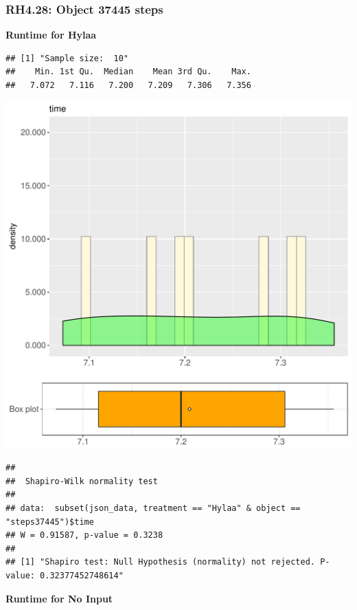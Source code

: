 \documentclass{article}\usepackage[]{graphicx}\usepackage[]{color}
\makeatletter
\def\maxwidth{ %
  \ifdim\Gin@nat@width>\linewidth
    \linewidth
  \else
    \Gin@nat@width
  \fi
}
\newenvironment{kframe}{%
 \def\at@end@of@kframe{}%
 \ifinner\ifhmode%
  \def\at@end@of@kframe{\end{minipage}}%
  \begin{minipage}{\columnwidth}%
 \fi\fi%
 \def\FrameCommand##1{\hskip\@totalleftmargin \hskip-\fboxsep
 \colorbox{shadecolor}{##1}\hskip-\fboxsep
     \hskip-\linewidth \hskip-\@totalleftmargin \hskip\columnwidth}%
 \MakeFramed {\advance\hsize-\width
   \@totalleftmargin\z@ \linewidth\hsize
   \@setminipage}}%
 {\par\unskip\endMakeFramed%
 \at@end@of@kframe}
\newenvironment{knitrout}{}{} %
\makeatother
\begin{document}
\subsubsection{RH4.28: Object 37445 steps}

 \textbf{Runtime for Hylaa}
\begin{knitrout}
\color{fgcolor}\begin{kframe}
\begin{verbatim}
## [1] "Sample size:  10"
##    Min. 1st Qu.  Median    Mean 3rd Qu.    Max. 
##   7.072   7.116   7.200   7.209   7.306   7.356
\end{verbatim}
\end{kframe}
\includegraphics[width=\maxwidth]{figure/RH4_Hylaa_steps37445-1} 
\begin{kframe}\begin{verbatim}
## 
## 	Shapiro-Wilk normality test
## 
## data:  subset(json_data, treatment == "Hylaa" & object == "steps37445")$time
## W = 0.91587, p-value = 0.3238
## 
## [1] "Shapiro test: Null Hypothesis (normality) not rejected. P-value: 0.32377452748614"
\end{verbatim}
\end{kframe}
\end{knitrout}
 \textbf{Runtime for No Input}
\end{document}
